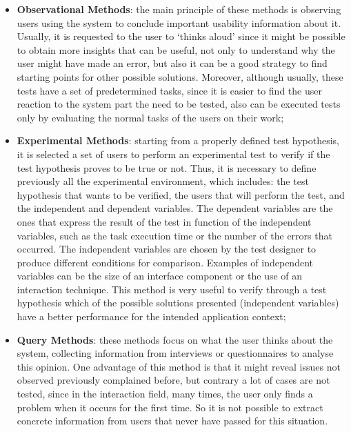 \begin{itemize}
	\item \textbf{Observational Methods}: the main principle of these methods is observing users using the system to conclude important usability information about it. Usually, it is requested to the user to ‘thinks aloud’ since it might be possible to obtain more insights that can be useful, not only to understand why the user might have made an error, but also it can be a good strategy to find starting points for other possible solutions. Moreover, although usually, these tests have a set of predetermined tasks, since it is easier to find the user reaction to the system part the need to be tested, also can be executed tests only by evaluating the normal tasks of the users on their work;
	\item \textbf{Experimental Methods}: starting from a properly defined test hypothesis, it is selected a set of users to perform an experimental test to verify if the test hypothesis proves to be true or not. Thus, it is necessary to define previously all the experimental environment, which includes: the test hypothesis that wants to be verified, the users that will perform the test,  and the independent and dependent variables. The dependent variables are the ones that express the result of the test in  function of the independent variables, such as the task execution time or the number of the errors that occurred. The independent variables are chosen by the test designer to produce different conditions for comparison. Examples of independent variables can be the size of an interface component or the use of an interaction technique. This method is very useful to verify through a test hypothesis which of the possible solutions presented (independent variables) have a better performance for the intended application context;
	\item \textbf{Query Methods}: these methods focus on what the user thinks about the system, collecting information from interviews or questionnaires to analyse this opinion. One advantage of this method is that it might reveal issues not observed previously complained before, but contrary a lot of cases are not tested, since in the interaction field, many times, the user only finds a problem when it occurs for the first time. So it is not possible to extract concrete information from users that never have passed for this situation.
\end{itemize}




